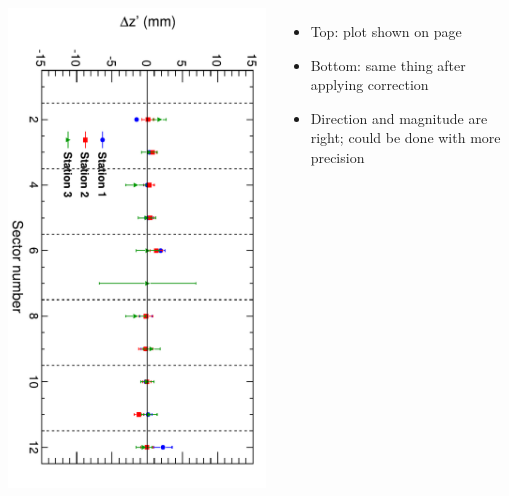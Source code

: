 \documentclass[compress]{beamer}
\begin{document}
\begin{frame}
\begin{columns}
\vfill
\includegraphics[height=\linewidth, angle=90]{zfits_stations_2nd.pdf}
\begin{itemize}
\item Top: plot shown on page~\pageref{summary}
\item Bottom: same thing after applying correction
\item Direction and magnitude are right; could be done with more precision
\end{itemize}
\end{columns}
\end{frame}
\end{document}
